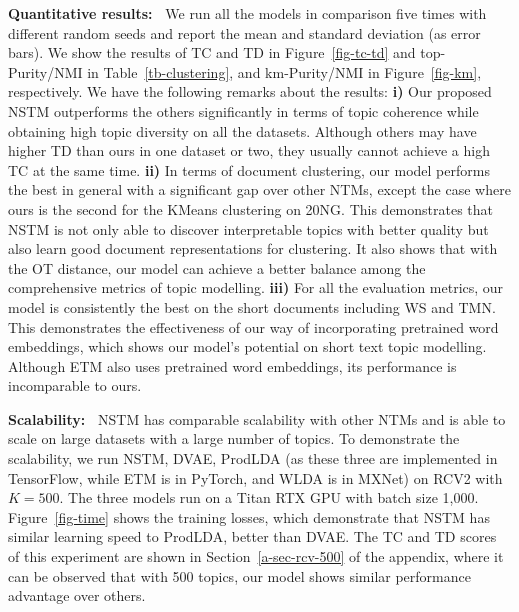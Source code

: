 \documentclass{article}
\begin{document}
\textbf{Quantitative results:~} We run all the models in comparison five times with different random seeds and report the mean and standard deviation (as error bars).
We show the results of TC and TD in Figure~\ref{fig-tc-td} and top-Purity/NMI in Table~\ref{tb-clustering}, and km-Purity/NMI in Figure~\ref{fig-km}, respectively.
We have the following remarks about the results:
\textbf{i)} Our proposed NSTM outperforms the others significantly in terms of topic coherence while obtaining high topic diversity on all the datasets. Although others may have higher TD than ours in one dataset or two, they usually cannot achieve a high TC at the same time.
\textbf{ii)} In terms of document clustering, our model performs the best in general with a significant gap over other NTMs, except the case where ours is the second for the KMeans clustering on 20NG. This demonstrates that NSTM is not only able to discover interpretable topics with better quality but also learn good document representations for clustering. It also shows that with the OT distance, our model can achieve a better balance among the comprehensive metrics of topic modelling.
\textbf{iii)} For all the evaluation metrics, our model is consistently the best on the short documents including WS and TMN. This demonstrates the effectiveness of our way of incorporating pretrained word embeddings, which shows our model's potential on short text topic modelling. Although ETM also uses pretrained word embeddings, its performance is incomparable to ours.





\textbf{Scalability:~}
NSTM has comparable scalability with other NTMs and is able to scale on large datasets with a large number of topics. To demonstrate the scalability, we run NSTM, DVAE, ProdLDA (as these three are implemented in TensorFlow, while ETM is in PyTorch, and WLDA is in MXNet) on RCV2 with $K=500$. The three models run on a Titan RTX GPU with batch size 1,000. Figure~\ref{fig-time} shows the training losses, which demonstrate that NSTM has similar learning speed to ProdLDA, better than DVAE. The TC and TD scores of this experiment are shown in Section~\ref{a-sec-rcv-500} of the appendix, where it can be observed that with 500 topics, our model shows similar performance advantage over others.
\end{document}

